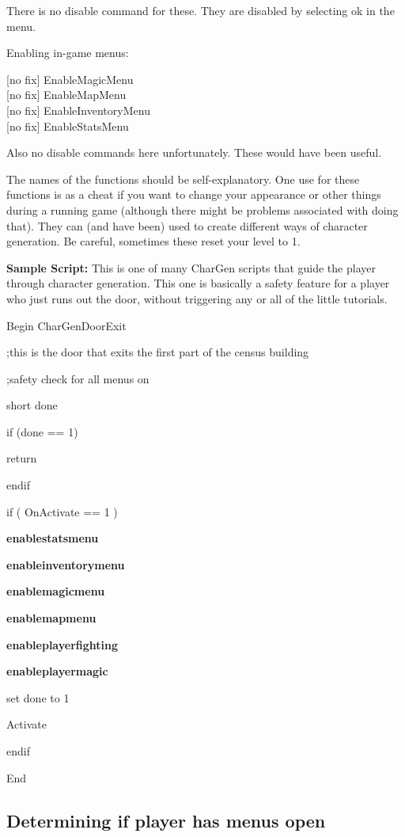 \documentclass[
]{article}
\begin{document}
There is no disable command for these. They are disabled by selecting ok
in the menu.

Enabling in-game menus:

{[}no fix{]} EnableMagicMenu\\
{[}no fix{]} EnableMapMenu\\
{[}no fix{]} EnableInventoryMenu\\
{[}no fix{]} EnableStatsMenu

Also no disable commands here unfortunately. These would have been
useful.

The names of the functions should be self-explanatory. One use for these
functions is as a cheat if you want to change your appearance or other
things during a running game (although there might be problems
associated with doing that). They can (and have been) used to create
different ways of character generation. Be careful, sometimes these
reset your level to 1.

\textbf{Sample Script:} This is one of many CharGen scripts that guide
the player through character generation. This one is basically a safety
feature for a player who just runs out the door, without triggering any
or all of the little tutorials.

Begin CharGenDoorExit

;this is the door that exits the first part of the census building

;safety check for all menus on

short done

if (done == 1)

return

endif

if ( OnActivate == 1 )

\textbf{enablestatsmenu}

\textbf{enableinventorymenu}

\textbf{enablemagicmenu}

\textbf{enablemapmenu}

\textbf{enableplayerfighting}

\textbf{enableplayermagic}

set done to 1

Activate

endif

End

\hypertarget{determining-if-player-has-menus-open}{%
\subsection{Determining if player has menus
open}\label{determining-if-player-has-menus-open}}
\end{document}
